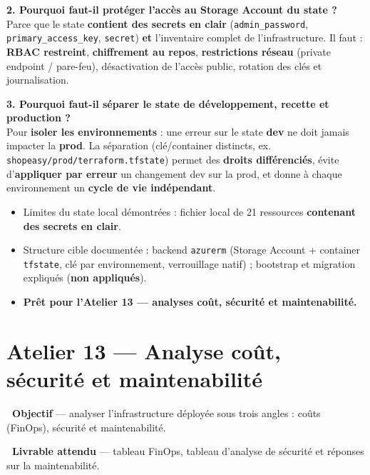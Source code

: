 \documentclass[11pt,a4paper]{article}
\newcommand{\emo}[1]{\raisebox{-0.14em}{\twemoji{#1}}}
\newcommand{\eTarget}{\emo{1f3af}}
\newcommand{\ePackage}{\emo{1f4e6}}
\newcommand{\code}[1]{\texttt{#1}}
\begin{document}
\textbf{2. Pourquoi faut-il protéger l'accès au Storage Account du state ?}\\
Parce que le state \textbf{contient des secrets en clair} (\code{admin\_password}, \code{primary\_access\_key},
\code{secret}) \textbf{et} l'inventaire complet de l'infrastructure. Il faut : \textbf{RBAC restreint},
\textbf{chiffrement au repos}, \textbf{restrictions réseau} (private endpoint / pare-feu), désactivation de
l'accès public, rotation des clés et journalisation.

\textbf{3. Pourquoi faut-il séparer le state de développement, recette et production ?}\\
Pour \textbf{isoler les environnements} : une erreur sur le state \textbf{dev} ne doit jamais impacter la
\textbf{prod}. La séparation (clé/container distincts, ex. \code{shopeasy/prod/terraform.tfstate}) permet des
\textbf{droits différenciés}, évite d'\textbf{appliquer par erreur} un changement dev sur la prod, et donne à
chaque environnement un \textbf{cycle de vie indépendant}.

\begin{etatbox}
\begin{itemize}
  \item Limites du state local démontrées : fichier local de 21 ressources \textbf{contenant des secrets en clair}.
  \item Structure cible documentée : backend \code{azurerm} (Storage Account + container \code{tfstate}, clé par environnement, verrouillage natif) ; bootstrap et migration expliqués (\textbf{non appliqués}).
  \item \textbf{Prêt pour l'Atelier 13 — analyses coût, sécurité et maintenabilité.}
\end{itemize}
\end{etatbox}


\section{Atelier 13 — Analyse coût, sécurité et maintenabilité}

\begin{fiche}
\textbf{\eTarget~Objectif} — analyser l'infrastructure déployée sous trois angles : coûts (FinOps), sécurité et maintenabilité.

\textbf{\ePackage~Livrable attendu} — tableau FinOps, tableau d'analyse de sécurité et réponses sur la maintenabilité.
\end{fiche}
\end{document}
